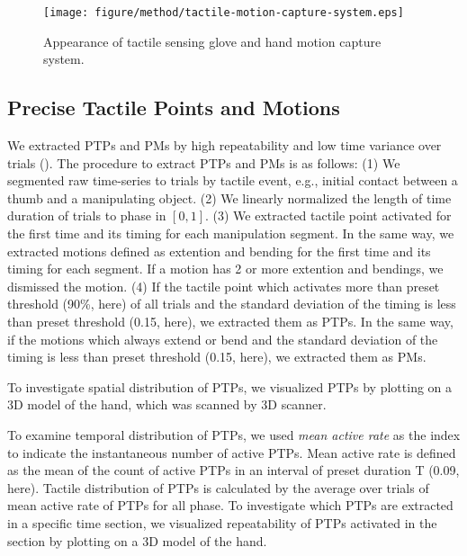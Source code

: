 \documentclass[letterpaper, 10 pt, conference]{IEEEtran}  %
\begin{document}
\begin{figure}[t!]
 \centering
  \texttt{[image: figure/method/tactile-motion-capture-system.eps]}
 \caption{Appearance of tactile sensing glove and hand motion capture system.}
 \label{fig:glove}
\end{figure}


\subsection{Precise Tactile Points and Motions}

We extracted PTPs and PMs by high repeatability and low time variance over trials (). The procedure to extract PTPs and PMs is as follows: (1) We segmented raw time-series to trials by tactile event, e.g., initial contact between a thumb and a manipulating object. (2) We linearly normalized the length of time duration of trials to phase in $[0, 1]$. (3) We extracted tactile point activated for the first time and its timing for each manipulation segment. In the same way, we extracted motions defined as extention and bending for the first time and its timing for each segment. If a motion has 2 or more extention and bendings, we dismissed the motion. (4) If the tactile point which activates more than preset threshold (90\%, here) of all trials and the standard deviation of the timing is less than preset threshold (0.15, here), we extracted them as PTPs. In the same way, if the motions which always extend or bend and the standard deviation of the timing is less than preset threshold (0.15, here), we extracted them as PMs. 

To investigate spatial distribution of PTPs, we visualized PTPs by plotting on a 3D model of the hand, which was scanned by 3D scanner.  

To examine temporal distribution of PTPs, we used {\it mean active rate} as the index to indicate the instantaneous number of active PTPs. Mean active rate is defined as the mean of the count of active PTPs in an interval of preset duration T (0.09, here). Tactile distribution of PTPs is calculated by the average over trials of mean active rate of PTPs for all phase. To investigate which PTPs are extracted in a specific time section, we visualized repeatability of PTPs activated in the section by plotting on a 3D model of the hand.
\end{document}

